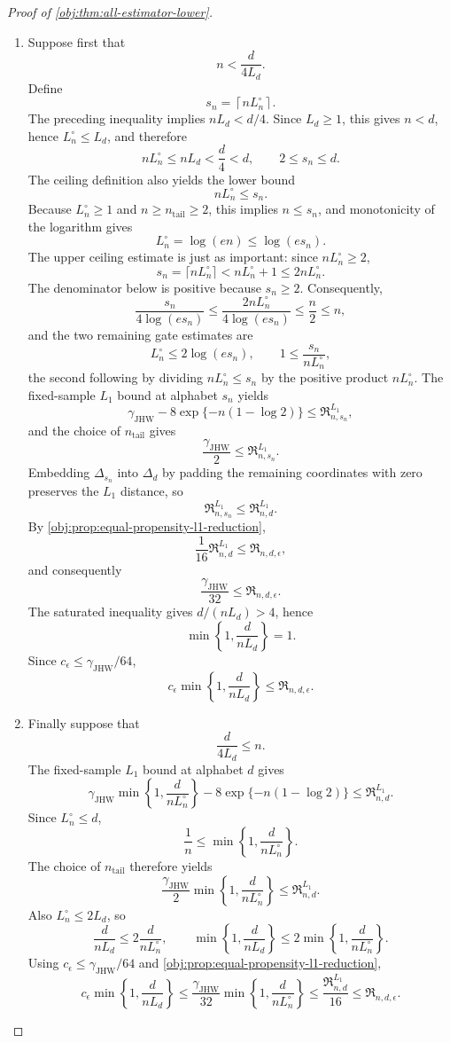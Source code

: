\begin{proof}[Proof of \cref{obj:thm:all-estimator-lower}]
\begin{enumerate}
\item
Suppose first that
\[
n<\frac{d}{4L_d}.
\]
Define
\[
s_n=\left\lceil nL_n^\circ\right\rceil .
\]
The preceding inequality implies \(nL_d<d/4\).  Since \(L_d\ge1\), this gives
\(n<d\), hence \(L_n^\circ\le L_d\), and therefore
\[
nL_n^\circ\le nL_d<\frac d4<d,
\qquad
2\le s_n\le d.
\]
The ceiling definition also yields the lower bound
\[
nL_n^\circ\le s_n.
\]
Because \(L_n^\circ\ge1\) and \(n\ge n_{\mathrm{tail}}\ge2\), this implies
\(n\le s_n\), and monotonicity of the logarithm gives
\[
L_n^\circ=\log(en)\le \log(es_n).
\]
The upper ceiling estimate is just as important: since \(nL_n^\circ\ge2\),
\[
s_n=\lceil nL_n^\circ\rceil
< nL_n^\circ+1
\le 2nL_n^\circ .
\]
The denominator below is positive because \(s_n\ge2\).  Consequently,
\[
\frac{s_n}{4\log(es_n)}
\le
\frac{2nL_n^\circ}{4\log(es_n)}
\le
\frac n2
\le n,
\]
and the two remaining gate estimates are
\[
L_n^\circ\le2\log(es_n),
\qquad
1\le\frac{s_n}{nL_n^\circ},
\]
the second following by dividing \(nL_n^\circ\le s_n\) by the positive product
\(nL_n^\circ\).
The fixed-sample \(L_1\) bound at alphabet \(s_n\) yields
\[
\gamma_{\mathrm{JHW}}
-
8\exp\{-n(1-\log2)\}
\le
\mathfrak R^{L_1}_{n,s_n},
\]
and the choice of \(n_{\mathrm{tail}}\) gives
\[
\frac{\gamma_{\mathrm{JHW}}}{2}
\le
\mathfrak R^{L_1}_{n,s_n}.
\]
Embedding \(\Delta_{s_n}\) into \(\Delta_d\) by padding the remaining
coordinates with zero preserves the \(L_1\) distance, so
\[
\mathfrak R^{L_1}_{n,s_n}\le \mathfrak R^{L_1}_{n,d}.
\]
By \cref{obj:prop:equal-propensity-l1-reduction},
\[
\frac{1}{16}\mathfrak R^{L_1}_{n,d}
\le
\mathfrak R_{n,d,\epsilon},
\]
and consequently
\[
\frac{\gamma_{\mathrm{JHW}}}{32}
\le
\mathfrak R_{n,d,\epsilon}.
\]
The saturated inequality gives \(d/(nL_d)>4\), hence
\[
\min\left\{1,\frac{d}{nL_d}\right\}=1.
\]
Since \(c_\epsilon\le\gamma_{\mathrm{JHW}}/64\),
\[
c_\epsilon\min\left\{1,\frac{d}{nL_d}\right\}
\le
\mathfrak R_{n,d,\epsilon}.
\]

\item
Finally suppose that
\[
\frac{d}{4L_d}\le n.
\]
The fixed-sample \(L_1\) bound at alphabet \(d\) gives
\[
\gamma_{\mathrm{JHW}}
\min\left\{1,\frac{d}{nL_n^\circ}\right\}
-
8\exp\{-n(1-\log2)\}
\le
\mathfrak R^{L_1}_{n,d}.
\]
Since \(L_n^\circ\le d\),
\[
\frac1n
\le
\min\left\{1,\frac{d}{nL_n^\circ}\right\}.
\]
The choice of \(n_{\mathrm{tail}}\) therefore yields
\[
\frac{\gamma_{\mathrm{JHW}}}{2}
\min\left\{1,\frac{d}{nL_n^\circ}\right\}
\le
\mathfrak R^{L_1}_{n,d}.
\]
Also \(L_n^\circ\le2L_d\), so
\[
\frac{d}{nL_d}
\le
2\frac{d}{nL_n^\circ},
\qquad
\min\left\{1,\frac{d}{nL_d}\right\}
\le
2\min\left\{1,\frac{d}{nL_n^\circ}\right\}.
\]
Using \(c_\epsilon\le\gamma_{\mathrm{JHW}}/64\) and
\cref{obj:prop:equal-propensity-l1-reduction},
\[
c_\epsilon\min\left\{1,\frac{d}{nL_d}\right\}
\le
\frac{\gamma_{\mathrm{JHW}}}{32}
\min\left\{1,\frac{d}{nL_n^\circ}\right\}
\le
\frac{\mathfrak R^{L_1}_{n,d}}{16}
\le
\mathfrak R_{n,d,\epsilon}.
\]
\end{enumerate}


\end{proof}
